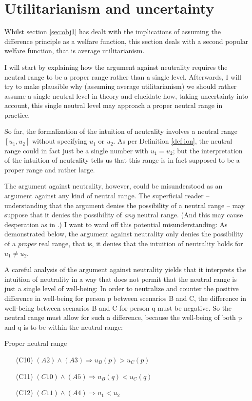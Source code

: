 \section{Utilitarianism and uncertainty}
\label{sec:obj2}

Whilst section \ref{sec:obj1} has dealt with the implications of assuming the difference principle as a welfare function, this section deals with a second popular welfare function, that is average utilitarianism. 

I will start by explaining how the argument against neutrality requires the neutral range to be a proper range rather than a single level. Afterwards, I will try to make plausible why (assuming average utilitarianism) we should rather assume a single neutral level in theory and elucidate how, taking uncertainty into account, this single neutral level may approach a proper neutral range in practice.  

So far, the formalization of the intuition of neutrality involves a neutral range $[u_1, u_2]$ without specifying $u_1$ or $u_2$. As per Definition \ref{def:ion}, the neutral range could in fact just be a single number with $u_1 = u_2$; but the interpretation of the intuition of neutrality tells us that this range is in fact supposed to be a proper range and rather large. 

The argument against neutrality, however, could be misunderstood as an argument against any kind of neutral range. The superficial reader -- understanding that the argument denies the possibility of a neutral range -- may suppose that it denies the possibility of \emph{any} neutral range. (And this may cause desperation as in .) I want to ward off this potential misunderstanding: As demonstrated below, the argument against neutrality only denies the possibility of a \emph{proper} real range, that is, it denies that the intuition of neutrality holds for $u_1 \neq u_2$. 

A careful analysis of the argument against neutrality yields that it interprets the intuition of neutrality in a way that does not permit that the neutral range is just a single level of well-being: In order to neutralize and counter the positive difference in well-being for person p between scenarios B and C, the difference in well-being between scenarios B and C for person q must be negative. So the neutral range must allow for such a difference, because the well-being of both p and q is to be within the neutral range:

\begin{Corollary}{Proper neutral range}{}
\begin{enumerate}
\item[(C10)] \hspace{1cm} $(A2)  \wedge (A3) \Rightarrow u_B(p) > u_C(p)$
\item[(C11)] \hspace{1cm} $(C10) \wedge (A5) \Rightarrow u_B(q) < u_C(q)$
\item[(C12)] \hspace{1cm} $(C11) \wedge (A4) \Rightarrow u_1 < u_2$
\end{enumerate}
\end{Corollary}

